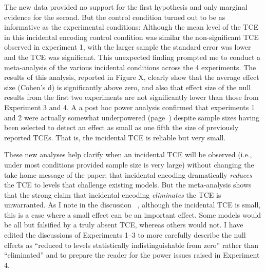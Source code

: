 \documentclass[12pt]{article}
\begin{document}
The new data provided no support for the first hypothesis and only marginal evidence for the second. But the control condition turned out to be as informative as the experimental conditions: Although the mean level of the TCE in this incidental encoding control condition was similar the non-significant TCE observed in experiment 1, with the larger sample the standard error was lower and the TCE was significant. This unexpected finding prompted me to conduct a meta-analysis of the various incidental conditions across the 4 experiments. The results of this analysis, reported in Figure X, clearly show that the average effect size (Cohen's d) is significantly above zero, and also that effect size of the null results from the first two experiments are not significantly lower than those from Experiment 3 and 4. A a post hoc power analysis confirmed that experiments 1 and 2 were actually somewhat underpowered (page~\pageref{power}) despite sample sizes having been selected to detect an effect as small as one fifth the size of previously reported TCEs. That is, the incidental TCE is reliable but very small.




These new analyses help clarify when an incidental TCE will be observed (i.e., under most conditions provided sample size is very large) without changing the take home message of the paper: that incidental encoding dramatically \emph{reduces} the TCE to levels that challenge existing models. But the meta-analysis shows that the strong claim that incidental encoding \emph{eliminates} the TCE is unwarranted. As I note in the discussion ~\pageref{zerovsnear}, although the incidental TCE is small, this is a case where a small effect can be an important effect. Some models would be all but falsified by a truly absent TCE, whereas others would not. I have edited the discussions of Experiments 1--3 to more carefully describe the null effects as ``reduced to levels statistically indistinguishable from zero'' rather than ``eliminated'' and to prepare the reader for the power issues raised in Experiment 4.
\end{document}
